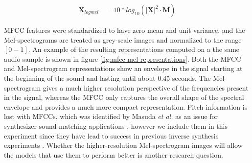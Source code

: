 \begin{align}\label{ref:eq-log-scale}
    \textbf{X}_{logmel} &= 10*log_{10}(|\textbf{X}|^2 \cdot \textbf{M})
\end{align}

MFCC features were standardized to have zero mean and unit variance, and the Mel-spectrograms are treated as grey-scale images and normalized to the range $[0-1]$. An example of the resulting representations computed on a the same audio sample is shown in figure \ref{fig:mfcc-mel-representations}. Both the MFCC and Mel-spectrogram representations show an envelope in the signal starting at the beginning of the sound and lasting until about 0.45 seconds. The Mel-spectrogram gives a much higher resolution perspective of the frequencies present in the signal, whereas the MFCC only captures the overall shape of the spectral envelope and provides a much more compact representation. Pitch information is lost with MFCCs, which was identified by Masuda \textit{et al.} as an issue for synthesizer sound matching applications \cite{masudo2021quality}, however we include them in this experiment since they have lead to success in previous inverse synthesis experiments \cite{yee2018automatic}. Whether the higher-resolution Mel-spectrogram images will allow the models that use them to perform better is another research question.

